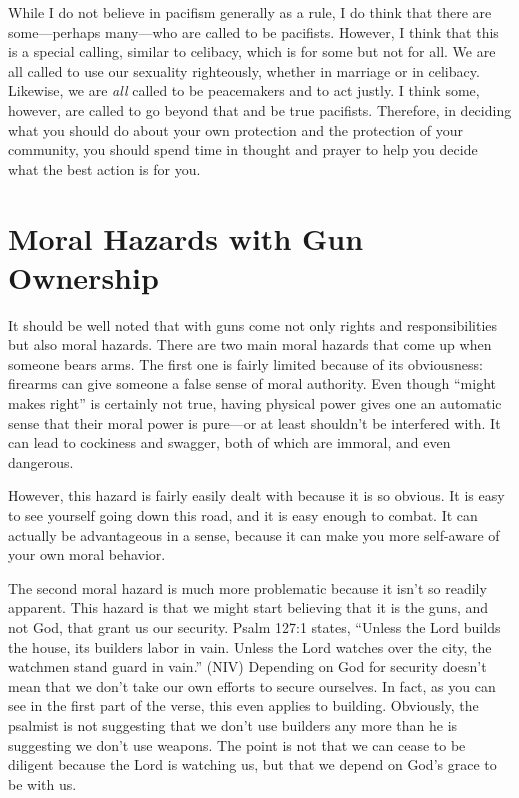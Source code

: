While I do not believe in pacifism generally as a rule, I do think that
there are some—perhaps many—who are called to be pacifists. However, I
think that this is a special calling, similar to celibacy, which is for
some but not for all. We are all called to use our sexuality
righteously, whether in marriage or in celibacy. Likewise, we are
\textit{all} called to be peacemakers and to act justly. I think some,
however, are called to go beyond that and be true pacifists. Therefore,
in deciding what you should do about your own protection and the
protection of your community, you should spend time in thought and
prayer to help you decide what the best action is for you.

\section{Moral Hazards with Gun Ownership}

It should be well noted that with guns come not only rights and
responsibilities but also moral hazards. There are two main moral
hazards that come up when someone bears arms. The first one is fairly
limited because of its obviousness: firearms can give someone a false
sense of moral authority. Even though “might makes right” is certainly
not true, having physical power gives one an automatic sense that their
moral power is pure—or at least shouldn’t be interfered with. It can
lead to cockiness and swagger, both of which are immoral, and even
dangerous.

However, this hazard is fairly easily dealt with because it is so
obvious. It is easy to see yourself going down this road, and it is
easy enough to combat. It can actually be advantageous in a sense,
because it can make you more self-aware of your own moral behavior.

The second moral hazard is much more problematic because it isn’t so
readily apparent.  This hazard is that we might start believing that it
is the guns, and not God, that grant us our security. Psalm 127:1
states, “Unless the Lord builds the house, its builders labor in vain.
Unless the Lord watches over the city, the watchmen stand guard in
vain.” (NIV)  Depending on God for security doesn’t mean that we don’t
take our own efforts to secure ourselves. In fact, as you can see in
the first part of the verse, this even applies to building. Obviously,
the psalmist is not suggesting that we don’t use builders any more than
he is suggesting we don’t use weapons. The point is not that we can
cease to be diligent because the Lord is watching us, but that we
depend on God’s grace to be with us.

